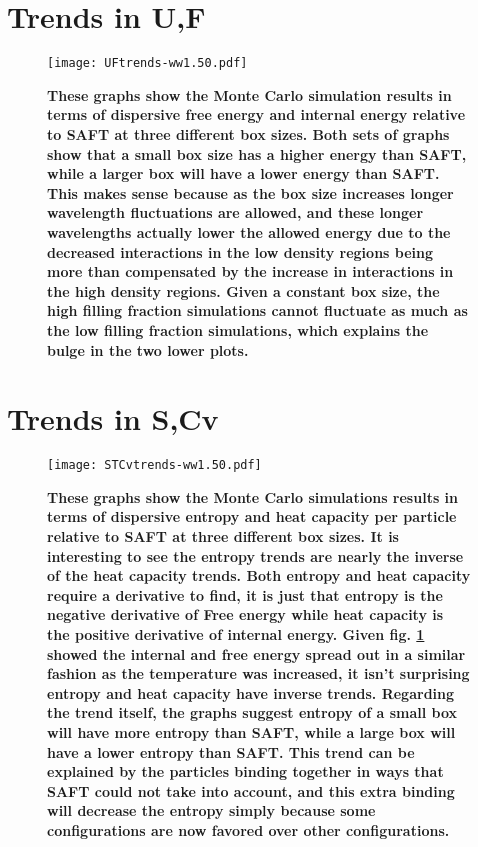 \section{Trends in U,F}
\begin{figure}[h]
\vspace*{-40mm}
\hspace*{-6mm}
	\centering
	\texttt{[image: UFtrends-ww1.50.pdf]}
	\caption{
	\scriptsize\textbf{
	These graphs show the Monte Carlo simulation results in terms of dispersive free energy and internal energy relative to SAFT at three different box sizes. Both sets of graphs show that a small box size has a higher energy than SAFT, while a larger box will have a lower energy than SAFT. This makes sense because as the box size increases longer wavelength fluctuations are allowed, and these longer wavelengths actually lower the allowed energy due to the decreased interactions in the low density regions being more than compensated by the increase in interactions in the high density regions. Given a constant box size, the high filling fraction simulations cannot fluctuate as much as the low filling fraction simulations, which explains the bulge in the two lower plots.}}
	\label{fig:UFtrends}
\end{figure}


\pagebreak
\section{Trends in S,Cv}
\begin{figure}[h]
\vspace*{-40mm}
\hspace*{-6mm}
	\centering
	\texttt{[image: STCvtrends-ww1.50.pdf]}
	\caption{\scriptsize\textbf{
	These graphs show the Monte Carlo simulations results in terms of dispersive entropy and heat capacity per particle relative to SAFT at three different box sizes. It is interesting to see the entropy trends are nearly the inverse of the heat capacity trends. Both entropy and heat capacity require a derivative to find, it is just that entropy is the negative derivative of Free energy while heat capacity is the positive derivative of internal energy. Given fig. \ref{fig:UFtrends} showed the internal and free energy spread out in a similar fashion as the temperature was increased, it isn't surprising entropy and heat capacity have inverse trends. Regarding the trend itself, the graphs suggest entropy of a small box will have more entropy than SAFT, while a large box will have a lower entropy than SAFT. This trend can be explained by the particles binding together in ways that SAFT could not take into account, and this extra binding will decrease the entropy simply because some configurations are now favored over other configurations.}}
	\label{fig:STCvtrends}
\end{figure}


